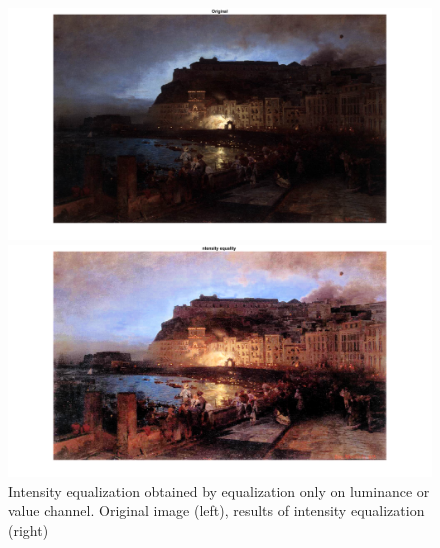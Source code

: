 \documentclass[conference]{IEEEtran}
\begin{document}
\begin{figure}[ht]
\begin{multicols}{2}
    \includegraphics[width=\linewidth]{inteq21.png}\par 
    \includegraphics[width=\linewidth]{inteq22.png}\par 
    \end{multicols}
\caption{Intensity equalization obtained by equalization only on luminance or value channel. Original image (left), results of intensity equalization (right)}
\label{int_2}
\end{figure}
\end{document}
